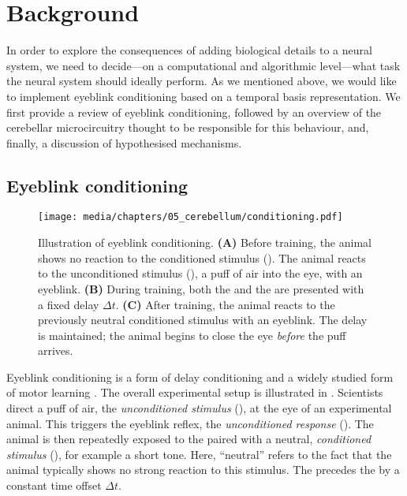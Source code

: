 
\section{Background}

In order to explore the consequences of adding biological details to a neural system, we need to decide---on a computational and algorithmic level---what task the neural system should ideally perform.
As we mentioned above, we would like to implement eyeblink conditioning based on a temporal basis representation.
We first provide a review of eyeblink conditioning, followed by an overview of the cerebellar microcircuitry thought to be responsible for this behaviour, and, finally, a discussion of hypothesised mechanisms.

\subsection{Eyeblink conditioning}

\begin{figure}
	\texttt{[image: media/chapters/05\_cerebellum/conditioning.pdf]}
	\caption[Illustration of eyeblink conditioning.]{
	Illustration of eyeblink conditioning.
	\textbf{(A)} Before training, the animal shows no reaction to the conditioned stimulus (\CS).
	The animal reacts to the unconditioned stimulus (\US), a puff of air into the eye, with an eyeblink.
	\textbf{(B)} During training, both the \CS and the \US are presented with a fixed delay $\Delta t$.
	\textbf{(C)} After training, the animal reacts to the previously neutral conditioned stimulus with an eyeblink. The delay is maintained; the animal begins to close the eye \emph{before} the puff arrives.
	}
	\label{fig:conditioning}
\end{figure}

Eyeblink conditioning is a form of delay conditioning and a widely studied form of motor learning \citep[e.g.,][Chapter~42, pp.~975-979]{kandel2012principles}.
The overall experimental setup is illustrated in .
Scientists direct a puff of air, the \emph{unconditioned stimulus} (\US), at the eye of an experimental animal.
This triggers the eyeblink reflex, the \emph{unconditioned response} (\UR).
The animal is then repeatedly exposed to the \US paired with a neutral, \emph{conditioned stimulus} (\CS), for example a short tone.
Here, \enquote{neutral} refers to the fact that the animal typically shows no strong reaction to this stimulus.
The \CS precedes the \US by a constant time offset $\Delta t$.

